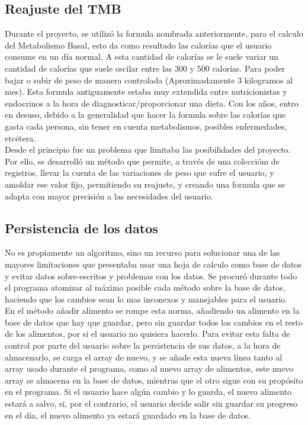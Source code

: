 \subsection{Reajuste del TMB}
Durante el proyecto, se utilizó la formula nombrada anteriormente, para el calculo del Metabolismo Basal, esto da como resultado las calorías que el usuario consume en un día normal. A esta cantidad de calorías se le suele variar un cantidad de calorías que suele oscilar entre las 300 y 500 calorías. Para poder bajar o subir de peso de manera controlada (Aproximadamente 3 kilogramos al mes). Esta formula antiguamente estaba muy extendida entre nutricionistas y endocrinos a la hora de diagnosticar/proporcionar una dieta. Con los años, entro en desuso, debido a la generalidad que hacer la formula sobre las calorías que gasta cada persona, sin tener en cuenta metabolismos, posibles enfermedades, etcétera.\\

Desde el principio fue un problema que limitaba las posibilidades del proyecto. Por ello, se desarrolló un método que permite, a través de una coleccióm de registros, llevar la cuenta de las variaciones de peso que sufre el usuario, y amoldar ese valor fijo, permitiendo su reajuste, y creando una formula que se adapta con mayor precisión a las necesidades del usuario.\\

\subsection{Persistencia de los datos}
No es propiamente un algoritmo, sino  un recurso para solucionar una de las mayores limitaciones que presentaba usar una hoja de calculo como base de datos y evitar  datos sobre-escritos y problemas con los datos. Se procuró durante todo el programa atomizar al máximo posible cada método sobre la base de datos, haciendo que los cambios sean lo mas inconexos y manejables para el usuario. \\

En el método añadir alimento se rompe esta norma, añadiendo un alimento en la base de datos que hay que guardar, pero sin guardar todos los cambios en el resto de los alimentos, por si el usuario no quisiera hacerlo. Para evitar esta falta de control por parte del usuario sobre la persistencia de sus datos, a la hora de almacenarlo, se carga el array de nuevo, y se añade esta nueva línea tanto al array usado durante el programa, como al nuevo array de alimentos, este nuevo array se almacena en la base de datos, mientras que el otro sigue con su propósito en el programa. Si el usuario hace algún cambio y lo guarda, el nuevo alimento estará a salvo, si, por el contrario, el usuario decide salir sin guardar su progreso en el día, el nuevo alimento ya estará guardado en la base de datos.\\
